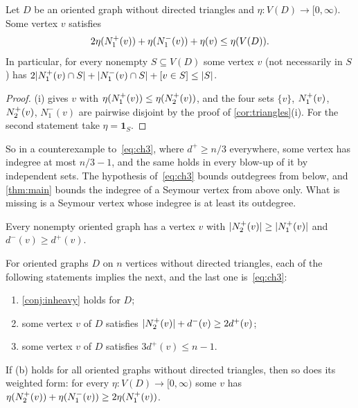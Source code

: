 \begin{proposition}\label{prop:ch-weighted}
Let $D$ be an oriented graph without directed triangles and $\eta:V(D)\to[0,\infty)$.
Some vertex $v$ satisfies
\begin{equation}\label{eq:ch-weighted}
 2\eta(N^+_1(v))+\eta(N^-_1(v))+\eta(v)\le\eta(V(D)).
\end{equation}
In particular, for every nonempty $S\subseteq V(D)$ some vertex $v$ (not necessarily in
$S$) has $2\lvert N^+_1(v)\cap S\rvert+\lvert N^-_1(v)\cap S\rvert+[v\in S]\le\lvert S\rvert$.
\end{proposition}

\begin{proof}
(i) gives $v$ with $\eta(N^+_1(v))\le\eta(N^+_2(v))$, and the four
sets $\{v\}$, $N^+_1(v)$, $N^+_2(v)$, $N^-_1(v)$ are pairwise disjoint by the proof of
\cref{cor:triangles}(i). For the second statement take $\eta=\mathbf 1_S$.
\end{proof}

So in a counterexample to~\eqref{eq:ch3}, where $d^+\ge n/3$ everywhere, some vertex has
indegree at most $n/3-1$, and the same holds in every blow-up of it by independent
sets. The hypothesis of~\eqref{eq:ch3} bounds outdegrees from below, and \cref{thm:main}
bounds the indegree of a Seymour vertex from above only. What is missing is a Seymour
vertex whose indegree is at least its outdegree.

\begin{conjecture}\label{conj:inheavy}
Every nonempty oriented graph has a vertex $v$ with
$\lvert N^+_2(v)\rvert\ge\lvert N^+_1(v)\rvert$ and $d^-(v)\ge d^+(v)$.
\end{conjecture}

\begin{lemma}\label{lem:conj-implies-ch}
For oriented graphs $D$ on $n$ vertices without directed triangles, each of the
following statements implies the next, and the last one is~\eqref{eq:ch3}:
\begin{enumerate}[label=\textup{(\alph*)}]
\item \cref{conj:inheavy} holds for $D$;
\item some vertex $v$ of $D$ satisfies $\lvert N^+_2(v)\rvert+d^-(v)\ge2d^+(v)$;
\item some vertex $v$ of $D$ satisfies $3d^+(v)\le n-1$.
\end{enumerate}
If (b) holds for all oriented graphs without directed triangles, then so does its
weighted form: for every $\eta:V(D)\to[0,\infty)$ some $v$ has
$\eta(N^+_2(v))+\eta(N^-_1(v))\ge2\eta(N^+_1(v))$.
\end{lemma}

